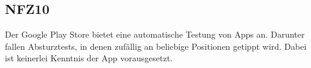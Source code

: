 \subsection*{NFZ10}

Der \Gls{Google Play Store} bietet eine automatische Testung von Apps an.
Darunter fallen Absturztests, in denen zufällig an beliebige Positionen getippt wird.
Dabei ist keinerlei Kenntnis der App vorausgesetzt.